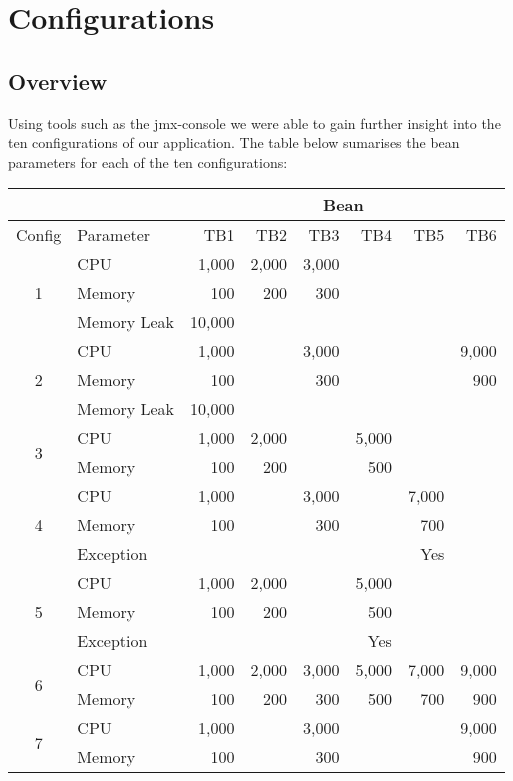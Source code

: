 \chapter{Configurations}

\section*{Overview}

Using tools such as the jmx-console we were able to gain further insight into the ten configurations of our application. The table below sumarises the bean parameters for each of the ten configurations:

\begin{center}
\begin{tabular}{| c | l | r | r | r | r | r | r |}
 \hline
 \multicolumn{2}{|c|}{} & \multicolumn{6}{|c|}{Bean} \\
 \hline
 Config & Parameter & TB1 & TB2 & TB3 & TB4 & TB5 & TB6 \\ \hline
 \multirow{3}{*}{1} & CPU & 1,000 & 2,000 & 3,000 & & &  \\
  & Memory & 100 & 200 & 300 & & & \\ 
  & Memory Leak & 10,000 & & & & & \\ \hline
 \multirow{3}{*}{2} & CPU & 1,000 & & 3,000 & & & 9,000 \\
  & Memory & 100 & & 300 & & & 900 \\ 
  & Memory Leak & 10,000 & & & & & \\ \hline
 \multirow{2}{*}{3} & CPU & 1,000 & 2,000 & & 5,000 & & \\
  & Memory & 100 & 200 & & 500 & & \\\hline
 \multirow{3}{*}{4} & CPU & 1,000 & & 3,000 & & 7,000 & \\
  & Memory & 100 & & 300 & & 700 & \\
  & Exception & & & & & Yes & \\ \hline
 \multirow{3}{*}{5} & CPU & 1,000 & 2,000 & & 5,000 & & \\
  & Memory & 100 & 200 & & 500 & & \\
  & Exception & & & & Yes & & \\ \hline
 \multirow{2}{*}{6} & CPU & 1,000 & 2,000 & 3,000 & 5,000 & 7,000 & 9,000 \\
  & Memory & 100 & 200 & 300 & 500 & 700 & 900 \\ \hline
 \multirow{2}{*}{7} & CPU & 1,000 & & 3,000 & & & 9,000 \\
  & Memory & 100 & & 300 & & & 900 \\ \hline

\end{tabular}
\end{center}
